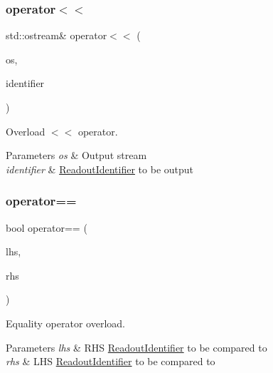 \subsubsection{\texorpdfstring{operator$<$$<$}{operator<<}}
{\footnotesize\ttfamily std\+::ostream\& operator$<$$<$ (\begin{DoxyParamCaption}\item[{std\+::ostream \&}]{os,  }\item[{const \hyperlink{class_readout_identifier}{Readout\+Identifier} \&}]{identifier }\end{DoxyParamCaption})\hspace{0.3cm}{\ttfamily [friend]}}



Overload $<$$<$ operator. 


\begin{DoxyParams}{Parameters}
{\em os} & Output stream \\
\hline
{\em identifier} & \hyperlink{class_readout_identifier}{Readout\+Identifier} to be output \\
\hline
\end{DoxyParams}
\mbox{\label{class_readout_identifier_a91bb6963f51c84fd2d8bcf104fc0b226}} 
\subsubsection{\texorpdfstring{operator==}{operator==}}
{\footnotesize\ttfamily bool operator== (\begin{DoxyParamCaption}\item[{const \hyperlink{class_readout_identifier}{Readout\+Identifier} \&}]{lhs,  }\item[{const \hyperlink{class_readout_identifier}{Readout\+Identifier} \&}]{rhs }\end{DoxyParamCaption})\hspace{0.3cm}{\ttfamily [friend]}}



Equality operator overload. 


\begin{DoxyParams}{Parameters}
{\em lhs} & R\+HS \hyperlink{class_readout_identifier}{Readout\+Identifier} to be compared to \\
\hline
{\em rhs} & L\+HS \hyperlink{class_readout_identifier}{Readout\+Identifier} to be compared to \\
\hline
\end{DoxyParams}


